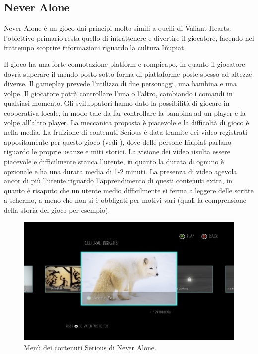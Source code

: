 \subsection{Never Alone}

Never Alone è un gioco dai principi molto simili a quelli di Valiant Hearts: l'obiettivo primario resta quello di intrattenere e divertire il giocatore, facendo nel frattempo scoprire informazioni riguardo la cultura Iñupiat.

Il gioco ha una forte connotazione platform e rompicapo, in quanto il giocatore dovrà superare il mondo posto sotto forma di piattaforme poste spesso ad altezze diverse. Il gameplay prevede l'utilizzo di due personaggi, una bambina e una volpe. Il giocatore potrà controllare l'una o l'altro, cambiando i comandi in qualsiasi momento. Gli sviluppatori hanno dato la possibilità di giocare in cooperativa locale, in modo tale da far controllare la bambina ad un player e la volpe all'altro player.
La meccanica proposta è piacevole e la difficoltà di gioco è nella media. La fruizione di contenuti Serious è data tramite dei video registrati appositamente per questo gioco (vedi \myfig{\ref{fig:videona}}), dove delle persone Iñupiat parlano riguardo le proprie usanze e miti storici. La visione dei video risulta essere piacevole e difficilmente stanca l'utente, in quanto la durata di ognuno è opzionale e ha una durata media di 1-2 minuti. La presenza di video agevola ancor di più l'utente riguardo l'apprendimento di questi contenuti extra, in quanto è risaputo che un utente medio difficilmente si ferma a leggere delle scritte a schermo, a meno che non si è obbligati per motivi vari (quali la comprensione della storia del gioco per esempio).

\begin{figure}[h]
\centerline{\includegraphics[scale=0.22]{images/statoarte/videona.jpg}}
\caption{Menù dei contenuti Serious di Never Alone.}
\label{fig:videona}
\end{figure}

